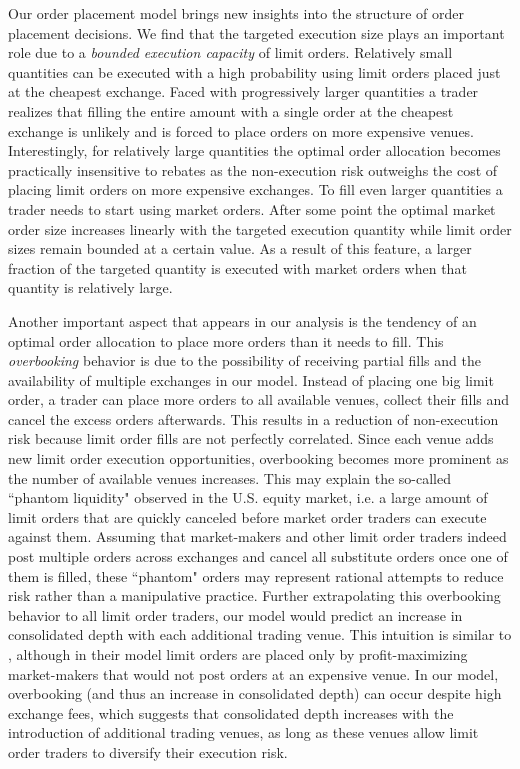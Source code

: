 \documentclass[opre,nonblindrev]{informs3}
\begin{document}
Our   order placement model brings new insights into the structure of order placement decisions. We find that the targeted execution size plays an important role due to a {\it bounded execution capacity} of limit orders. Relatively small quantities can be executed with a high probability using limit orders placed just at the cheapest exchange. Faced with progressively larger quantities a trader realizes that filling the entire amount with a single order at the cheapest exchange is unlikely and is forced to place orders on more expensive venues. Interestingly, for relatively large quantities the optimal order allocation becomes practically insensitive to rebates as the non-execution risk outweighs the cost of placing limit orders on more expensive exchanges. To fill even larger quantities a trader needs to start using market orders. After some point the optimal market order size increases linearly with the targeted execution quantity while limit order sizes remain bounded at a certain value. As a result of this feature, a larger fraction of the targeted quantity is executed with market orders when that quantity is relatively large.

Another important aspect that appears in our analysis is the tendency of an optimal order allocation to place more orders than it needs to fill. This {\it overbooking} behavior is due to the possibility of receiving partial fills and the availability of multiple exchanges in our model. Instead of placing one big limit order, a trader can place more orders to all available venues, collect their fills and cancel the excess orders afterwards. This results in a reduction of non-execution risk because limit order fills are not perfectly correlated. Since each venue adds new limit order execution opportunities, overbooking becomes more prominent as the number of available venues increases. This  may explain the so-called ``phantom liquidity" observed in the U.S. equity market, i.e. a large amount of limit orders that are quickly canceled before market order traders can execute against them. Assuming that market-makers and other limit order traders indeed post multiple orders across exchanges and cancel all substitute orders once one of them is filled, these ``phantom" orders may represent rational attempts to reduce risk rather than a manipulative practice. Further extrapolating this overbooking behavior to all limit order traders, our model would predict an increase in consolidated depth with each additional trading venue. This intuition is similar to \citet{Foucault2008}, although in their model limit orders are placed only by profit-maximizing market-makers that would not post orders at an expensive venue. In our model, overbooking (and thus an increase in consolidated depth) can occur despite  high exchange fees, which suggests that consolidated depth  increases with the introduction of additional trading venues, as long as these venues allow limit order traders to diversify their execution risk.
\end{document}
